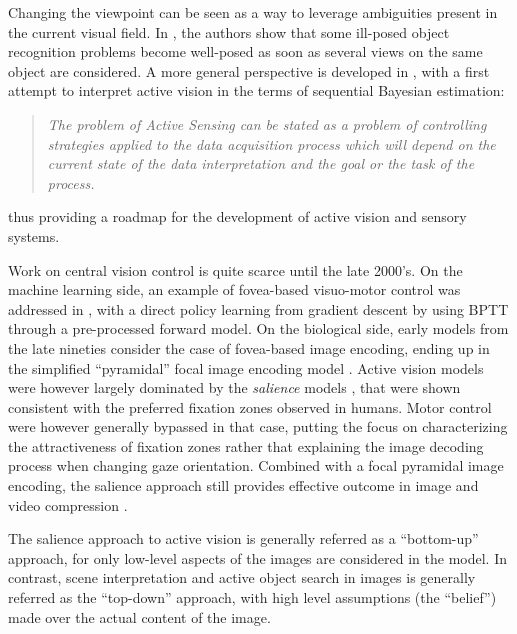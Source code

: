 \documentclass[12pt,twoside,openright]{article}
\begin{document}
Changing the viewpoint can be seen as a way to leverage ambiguities present in the current visual field. In \citet{aloimonos1988active}, the authors show that some ill-posed object recognition problems become well-posed as soon as several views on the  same object are considered. A more general perspective is developed in \citet{bajcsy1988active}, with a first attempt to interpret active vision in the terms of sequential Bayesian estimation:
\begin{quote}
	\emph{The problem  of Active Sensing can be stated as a problem of controlling strategies 
		applied to the data acquisition process which will depend on the current state 
		of the data interpretation and  the  goal  or the  task of  the  process.}
\end{quote}
thus providing a roadmap for the development of active vision and sensory systems.

Work on central vision control is quite scarce until the late 2000's.
On the machine learning side, an example of fovea-based visuo-motor control was  addressed in \citet{schmidhuber1991learning}, with a direct policy learning from gradient descent by using BPTT through a pre-processed forward model. 
On the biological  side, early models from the late nineties  consider the case of fovea-based image encoding, ending up in the simplified ``pyramidal'' focal image encoding model \citep{kortum1996implementation}. Active vision models were however largely dominated by the \emph{salience} models \citep{itti2000saliency, itti2001computational, itti2005bayesian}, that were shown consistent with the preferred fixation zones observed in humans. 
Motor control were however generally bypassed in that case, putting the focus on characterizing the attractiveness of fixation zones rather that explaining 
the image decoding process when changing gaze orientation.
Combined with a focal pyramidal image encoding, the salience approach still provides effective outcome in image and video compression  \citep{wang2003foveation,guo2010novel}.


The salience approach to active vision is generally referred as a ``bottom-up'' approach, for only low-level aspects of the images are considered in the model. In contrast, scene interpretation and active object search in images is generally referred as the ``top-down'' approach, with high level assumptions (the ``belief'') made over the actual content of the image. 
\end{document}
